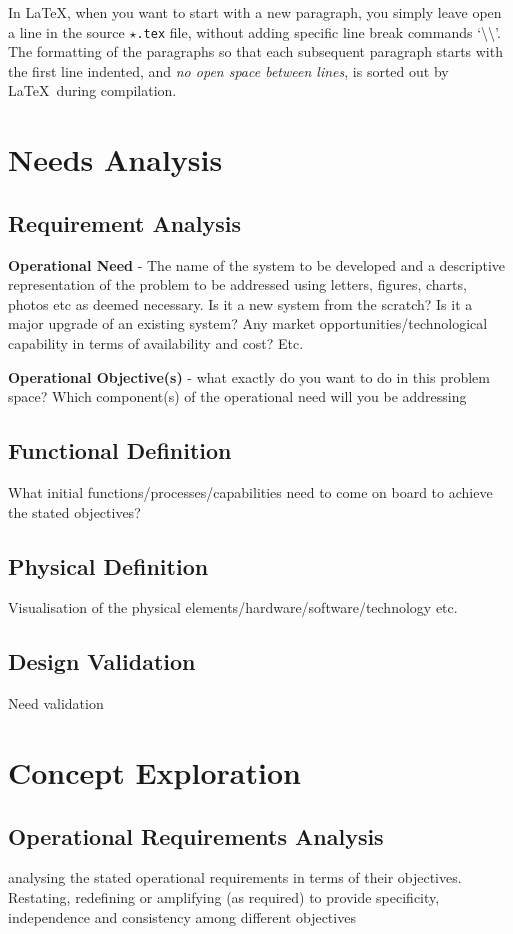 \documentclass[a4paper,11pt,fleqn]{report}
\begin{document}
In \LaTeX, when you want to start with a new paragraph, you simply leave open a line in the source \texttt{$\star$.tex} file, without adding specific line break commands `\textbackslash\textbackslash'. 
The formatting of the paragraphs so that each subsequent paragraph starts with the first line indented, and \emph{no open space between lines}, is sorted out by \LaTeX~during compilation.

\chapter{Needs Analysis}
\section{Requirement Analysis}
\textbf{Operational Need} - The name of the system to be developed and a descriptive representation of the problem to be addressed using letters, figures, charts, photos etc as deemed necessary. Is it a new system from the scratch? Is it a major upgrade of an existing system? Any market opportunities/technological capability in terms of availability and cost? Etc.

\textbf{Operational Objective(s)} - what exactly do you want to do in this problem space? Which component(s) of the operational need will you be addressing

\section{Functional Definition}
What initial functions/processes/capabilities need to come on board to
achieve the stated objectives?

\section{Physical Definition}
Visualisation of the physical elements/hardware/software/technology
etc.

\section{Design Validation}
Need validation

\chapter{Concept Exploration}
\section{Operational Requirements Analysis}
analysing the stated operational requirements in terms of their
objectives. Restating, redefining or amplifying (as required) to provide
specificity, independence and consistency among different
objectives
\end{document}
